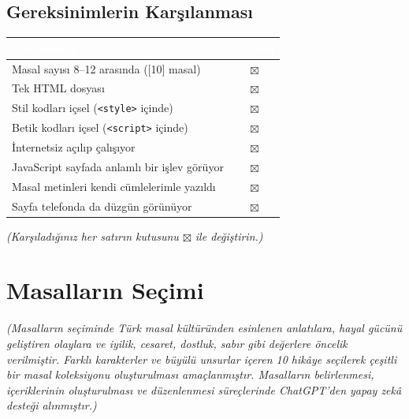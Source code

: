 \documentclass[12pt,a4paper]{article}
\newcommand{\aciklama}[1]{{\color{gray}\itshape (#1)}}
\begin{document}
\subsection{Gereksinimlerin Karşılanması}
\begin{center}
\begin{tabular}{@{}p{8.2cm}c@{}}
\toprule
\rowcolor{ana}\textcolor{white}{\textbf{Gereksinim}} & \textcolor{white}{\textbf{Durum}} \\
\midrule
Masal sayısı 8--12 arasında ([10] masal)        
                & $\boxtimes$ \\
Tek HTML dosyası                                   & $\boxtimes$ \\
Stil kodları içsel (\texttt{<style>} içinde)        
                & $\boxtimes$ \\
Betik kodları içsel (\texttt{<script>} içinde)      
                & $\boxtimes$ \\
İnternetsiz açılıp çalışıyor                       & $\boxtimes$ \\
JavaScript sayfada anlamlı bir işlev görüyor        & $\boxtimes$ \\
Masal metinleri kendi cümlelerimle yazıldı          & $\boxtimes$ \\
Sayfa telefonda da düzgün görünüyor                  
                  & $\boxtimes$ \\
\bottomrule
\end{tabular}
\end{center}
\aciklama{Karşıladığınız her satırın kutusunu $\boxtimes$ ile değiştirin.}

\section{Masalların Seçimi}
\aciklama{Masalların seçiminde Türk masal kültüründen esinlenen anlatılara, hayal gücünü geliştiren olaylara ve iyilik, cesaret, dostluk, sabır gibi değerlere öncelik verilmiştir. Farklı karakterler ve büyülü unsurlar içeren 10 hikâye seçilerek çeşitli bir masal koleksiyonu oluşturulması amaçlanmıştır. Masalların belirlenmesi, içeriklerinin oluşturulması ve düzenlenmesi süreçlerinde ChatGPT'den yapay zekâ desteği alınmıştır.}
\end{document}

